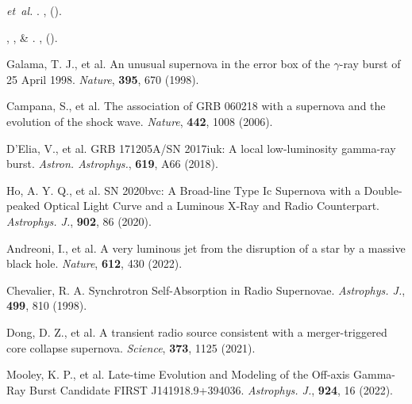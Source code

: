 \documentclass{nature_plusfigure}
\newcommand{\apj}{{Astrophys. J.}}
\newcommand{\aap}{{Astron. Astrophys.}}
\newcommand{\nat}{{Nature}}
\begin{document}
\begin{thebibliography}{100}
 \emph{et~al.}
\newblock {}.
\newblock \emph{} \textbf{},
   ().

, ,
   \& 
\newblock {}.
\newblock \emph{\bibinfo{journal}{\apj}} \textbf{},
   ().

 Galama, T. J., et al. An unusual supernova in the error box of the $\gamma$-ray burst of 25 April 1998. \emph{\nat}, \textbf{395}, 670 (1998). 

 Campana, S., et al. The association of GRB 060218 with a supernova and the evolution of the shock wave. \emph{\nat}, \textbf{442}, 1008 (2006). 

 D'Elia, V., et al. GRB 171205A/SN 2017iuk: A local low-luminosity gamma-ray burst. \emph{\aap}, \textbf{619}, A66 (2018). 

 Ho, A. Y. Q., et al. SN 2020bvc: A Broad-line Type Ic Supernova with a Double-peaked Optical Light Curve and a Luminous X-Ray and Radio Counterpart. \emph{\apj}, \textbf{902}, 86 (2020). 

 Andreoni, I., et al. A very luminous jet from the disruption of a star by a massive black hole. \emph{\nat}, \textbf{612}, 430 (2022). 

 
 Chevalier, R. A. Synchrotron Self-Absorption in Radio Supernovae. \emph{\apj}, \textbf{499}, 810 (1998). 
 
 Dong, D. Z., et al. A transient radio source consistent with a merger-triggered core collapse supernova. \emph{Science}, \textbf{373}, 1125 (2021). 

 Mooley, K. P., et al. Late-time Evolution and Modeling of the Off-axis Gamma-Ray Burst Candidate FIRST J141918.9+394036. \emph{\apj}, \textbf{924}, 16 (2022).   


\end{thebibliography}
\end{document}
